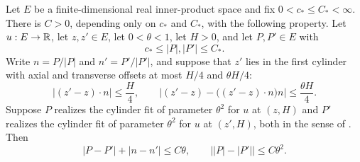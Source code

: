 \begin{lemma}
Let $E$ be a finite-dimensional real inner-product space and fix
$0<c_*\le C_*<\infty$. There is $C>0$, depending only on $c_*$ and $C_*$, with
the following property. Let $u:E\to\mathbb{R}$, let $z,z'\in E$, let $0<\theta<1$, let
$H>0$, and let $P,P'\in E$ with
\[
  c_*\le|P|,|P'|\le C_* .
\]
Write $n=P/|P|$ and $n'=P'/|P'|$, and suppose that $z'$ lies in the first
cylinder with axial and transverse offsets at most $H/4$ and $\theta H/4$:
\[
  |(z'-z)\cdot n|\le\frac H4,\qquad
  \bigl|(z'-z)-\bigl((z'-z)\cdot n\bigr)n\bigr|\le\frac{\theta H}4 .
\]
Suppose $P$ realizes the cylinder fit of parameter $\theta^2$ for $u$ at
$(z,H)$ and $P'$ realizes the cylinder fit of parameter $\theta^2$ for $u$ at
$(z',H)$, both in the sense of . Then
\[
  |P-P'|+|n-n'|\le C\theta,\qquad
  \bigl||P|-|P'|\bigr|\le C\theta^2 .
\]
\end{lemma}
